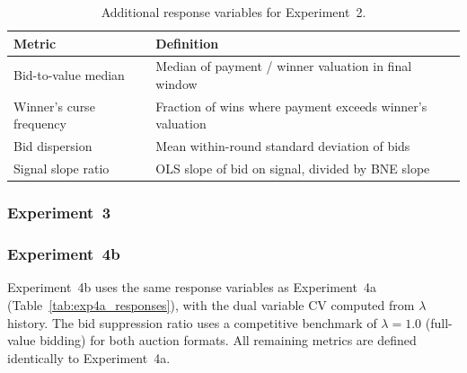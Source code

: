\begin{table}[H]
\centering
\caption{Additional response variables for Experiment~2.}
\label{tab:exp2_responses}
\begin{tabular}{l l}
\toprule
\textbf{Metric} & \textbf{Definition} \\
\midrule
Bid-to-value median & Median of payment / winner valuation in final window \\
Winner's curse frequency & Fraction of wins where payment exceeds winner's valuation \\
Bid dispersion & Mean within-round standard deviation of bids \\
Signal slope ratio & OLS slope of bid on signal, divided by BNE slope \\
\bottomrule
\end{tabular}
\end{table}



\subsubsection{Experiment~3}



\subsubsection{Experiment~4b}

Experiment~4b uses the same response variables as Experiment~4a (Table~\ref{tab:exp4a_responses}), with the dual variable CV computed from $\lambda$ history. The bid suppression ratio uses a competitive benchmark of $\lambda = 1.0$ (full-value bidding) for both auction formats. All remaining metrics are defined identically to Experiment~4a.


